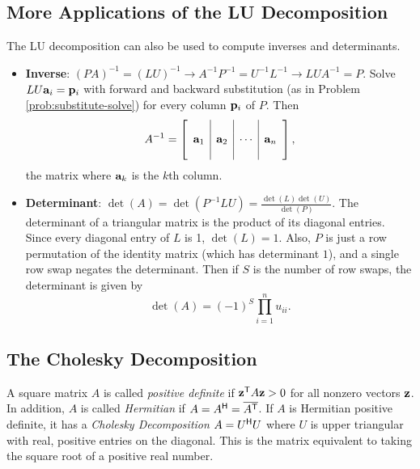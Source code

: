 \subsection*{More Applications of the LU Decomposition} %

The LU decomposition can also be used to compute inverses and determinants.

\begin{itemize}
\item \textbf{Inverse}:
$(PA)^{-1} = (LU)^{-1} \longrightarrow A^{-1}P^{-1} = U^{-1}L^{-1} \longrightarrow LUA^{-1} = P$.
Solve $LU\mathbf{a}_i = \mathbf{p}_i$ with forward and backward substitution (as in Problem \ref{prob:substitute-solve}) for every column $\mathbf{p}_i$ of $P$.
Then
\begin{align*}
A^{-1} =
\left[\begin{array}{c|c|c|c}
&&&\\
\mathbf{a}_1&\mathbf{a}_2&\cdots&\mathbf{a}_n
\\&&&
\end{array}\right],
\end{align*}
the matrix where $\mathbf{a}_k$ is the $k$th column.

\item \textbf{Determinant}: %
$\det(A) = \det(P^{-1}LU) = \frac{\det(L)\det(U)}{\det(P)}$.
The determinant of a triangular matrix is the product of its diagonal entries. Since every diagonal entry of $L$ is 1, $\det(L) = 1$.
Also, $P$ is just a row permutation of the identity matrix (which has determinant $1$), and a single row swap negates the determinant.
Then if $S$ is the number of row swaps, the determinant is given by
\[\det(A) = (-1)^S\prod_{i=1}^nu_{ii}.\]
\end{itemize}

\subsection*{The Cholesky Decomposition} %

A square matrix $A$ is called \emph{positive definite} if $\mathbf{z}^{\mathsf T} A\mathbf{z} > 0$ for all nonzero vectors $\mathbf{z}$.
In addition, $A$ is called \emph{Hermitian} if $A = A^{\mathsf H} = \overline{A^{\mathsf T}}$.
If $A$ is Hermitian positive definite, it has a \emph{Cholesky Decomposition} $A = U^{\mathsf H} U$ where $U$ is upper triangular with real, positive entries on the diagonal.
This is the matrix equivalent to taking the square root of a positive real number.

